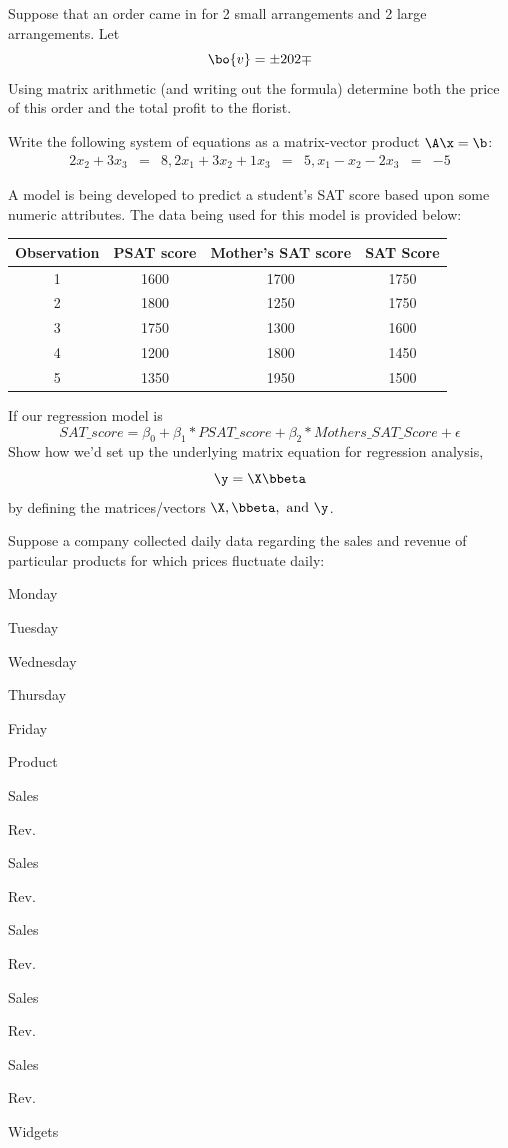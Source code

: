 \documentclass[
]{article}
\theoremstyle{definition}
\theoremstyle{definition}
\theoremstyle{definition}
\theoremstyle{definition}
\theoremstyle{remark}
\begin{document}
Suppose that an order came in for 2 small arrangements and 2 large arrangements. Let \[\bo{v} = \pm 2\\0\\2 \mp\]
Using matrix arithmetic (and writing out the formula) determine both the price of this order and the total profit to the florist.

Write the following system of equations as a matrix-vector product \(\A\x=\b\):
\begin{eqnarray}
2x_2 +3x_3&=& 8,
2x_1+3x_2+1x_3 &=& 5,
x_1-x_2-2x_3 &=&-5
\end{eqnarray}

A model is being developed to predict a student's SAT score based upon some numeric attributes. The data being used for this model is provided below:

\begin{longtable}[]{@{}cccc@{}}
\toprule
Observation & PSAT score & Mother's SAT score & SAT Score\tabularnewline
\midrule
\endhead
1 & 1600 & 1700 & 1750\tabularnewline
2 & 1800 & 1250 & 1750\tabularnewline
3 & 1750 & 1300 & 1600\tabularnewline
4 & 1200 & 1800 & 1450\tabularnewline
5 & 1350 & 1950 & 1500\tabularnewline
\bottomrule
\end{longtable}

If our regression model is
\[SAT\_score = \beta_0 + \beta_1* PSAT\_score + \beta_2* Mothers\_SAT\_Score + \epsilon\]
Show how we'd set up the underlying matrix equation for regression analysis,
\[\y = \X\bbeta \]
by defining the matrices/vectors \(\X, \bbeta, \mbox{ and } \y\).

Suppose a company collected daily data regarding the sales and revenue of particular products for which prices fluctuate daily:

Monday

Tuesday

Wednesday

Thursday

Friday

Product

Sales

Rev.

Sales

Rev.

Sales

Rev.

Sales

Rev.

Sales

Rev.

Widgets
\end{document}

